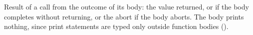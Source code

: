 Result of a call from the outcome of its body: the value returned, or  if the body
completes without returning, or the abort if the body aborts. The body prints nothing, since print statements are typed only outside
function bodies ().
